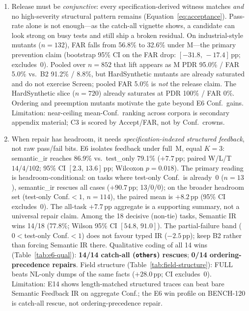 \begin{enumerate}
  \item[\textbf{C3.}]
    Release must be \emph{conjunctive}: every specification-derived witness
    matches \emph{and} no high-severity structural pattern remains
    (Equation~\eqref{eq:acceptance}).
    Pass-rate alone is not enough---as the catch-all vignette shows, a
    candidate can look strong on busy tests and still ship a broken residual.
    On industrial-style mutants ($n{=}132$), FAR falls from 56.8\% to
    32.6\% under M---the primary prevention claim (bootstrap 95\% CI on the
    FAR drop: $[-31.8,\,-17.4]$\,pp; excludes~0).
    Pooled over $n{=}852$ that lift appears as M PDR 95.0\% / FAR 5.0\%
    vs.\ B2 91.2\% / 8.8\%, but HardSynthetic mutants are already saturated
    and do not exercise Screen; pooled FAR 5.0\% is \emph{not} the release
    claim.
    The HardSynthetic slice ($n{=}720$) already saturates at PDR 100\% /
    FAR 0\%.
    Ordering and preemption mutants motivate the gate beyond E6 Conf.\ gains.
    Limitation: near-ceiling mean-Conf.\ ranking across corpora is secondary
    appendix material; C3 is scored by Accept/FAR, not by Conf.\ crowns.

  \item[\textbf{C2.}]
    When repair has headroom, it needs \emph{specification-indexed structured
    feedback}, not raw pass/fail bits.
    E6 isolates feedback under full~M, equal $K{=}3$: semantic\_ir reaches
    86.9\% vs.\ test\_only 79.1\% (${+}7.7$\,pp; paired W/L/T $14/4/102$;
    95\% CI $[2.3,\,13.6]$\,pp; Wilcoxon $p{=}0.018$).
    The primary reading is headroom-conditional: on tasks where test-only
    Conf.\ is already~$0$ ($n{=}13$), semantic\_ir rescues all cases
    (${+}90.7$\,pp; 13/0/0); on the broader headroom set (test-only
    Conf.${<}1$, $n{=}114$), the paired mean is ${+}8.2$\,pp (95\% CI
    excludes~0).
    The all-task ${+}7.7$\,pp aggregate is a supporting summary, not a
    universal repair claim.
    Among the 18 decisive (non-tie) tasks, Semantic IR wins 14/18 (77.8\%;
    Wilson 95\% CI $[54.8,\,91.0]$).
    The partial-failure band ($0{<}$test-only Conf.${<}1$) does not favour
    typed IR (${-}2.5$\,pp); keep B2 rather than forcing Semantic IR there.
    Qualitative coding of all 14 wins (Table~\ref{tab:e6-qual}):
    \textbf{14/14 catch-all (\texttt{others}) rescues};
    \textbf{0/14 ordering-precedence repairs}.
    Field structure (Table~\ref{tab:field-structure}): FULL beats NL-only
    dumps of the same facts (${+}28.0$\,pp; CI excludes~0).
    Limitation: E14 shows length-matched structured traces can beat bare
    Semantic Feedback IR on aggregate Conf.; the E6 win profile on BENCH-120
    is catch-all rescue, not ordering-precedence repair.


\end{enumerate}
